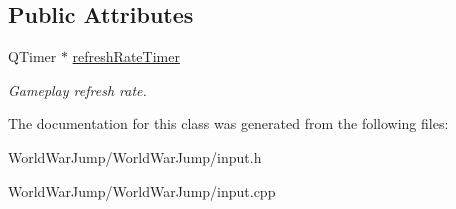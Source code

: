\subsection*{Public Attributes}
\begin{DoxyCompactItemize}
\item 
Q\+Timer $\ast$ \hyperlink{class_input_a3196d6cd66f0491bc90fd7a48e2d9c9c}{refresh\+Rate\+Timer}\hypertarget{class_input_a3196d6cd66f0491bc90fd7a48e2d9c9c}{}\label{class_input_a3196d6cd66f0491bc90fd7a48e2d9c9c}

\begin{DoxyCompactList}\small\item\em Gameplay refresh rate. \end{DoxyCompactList}\end{DoxyCompactItemize}


The documentation for this class was generated from the following files\+:\begin{DoxyCompactItemize}
\item 
World\+War\+Jump/\+World\+War\+Jump/input.\+h\item 
World\+War\+Jump/\+World\+War\+Jump/input.\+cpp\end{DoxyCompactItemize}
